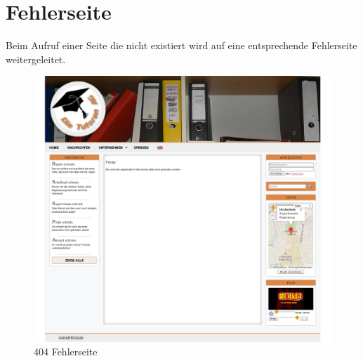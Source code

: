 \section{Fehlerseite}

Beim Aufruf einer Seite die nicht existiert wird auf eine entsprechende Fehlerseite weitergeleitet.

\begin{figure}[!htbp]
 \centering
 \includegraphics[width=1\textwidth]{../Screenshots/de/404}
 \caption{404 Fehlerseite}
 \label{fig:404}
\end{figure}
